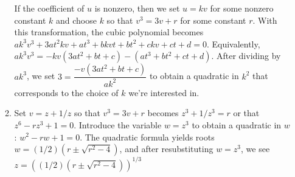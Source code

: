 \documentclass[11pt]{book}
\theoremstyle{definition}
\begin{document}
\begin{enumerate}
\begin{enumerate}
If the coefficient of $u$ is nonzero, then we set $u=kv$ for some nonzero constant $k$ and choose $k$ so that $v^3=3v+r$ for some constant $r$. With this transformation, the cubic polynomial becomes $ak^3v^3+3at^2kv+at^3+bkvt+bt^2+ckv+ct+d=0$. Equivalently, $ak^3v^3=-kv(3at^2+bt+c)-(at^3+bt^2+ct+d)$. After dividing by $ak^3$, we set $3=\dfrac{-v(3at^2+bt+c)}{ak^2}$ to obtain a quadratic in $k^2$ that corresponds to the choice of $k$ we're interested in.
\item Set $v=z+1/z$ so that $v^3=3v+r$ becomes $z^3+1/z^3=r$ or that $z^6-rz^3+1=0$. Introduce the variable $w=z^3$ to obtain a quadratic in $w$: $w^2-rw+1=0$. The quadratic formula yields roots $w=(1/2)(r\pm\sqrt{r^2-4})$, and after resubstituting $w=z^3$, we see $z=((1/2)(r\pm\sqrt{r^2-4}))^{1/3}$
\end{enumerate}
\end{enumerate}
\end{document}
